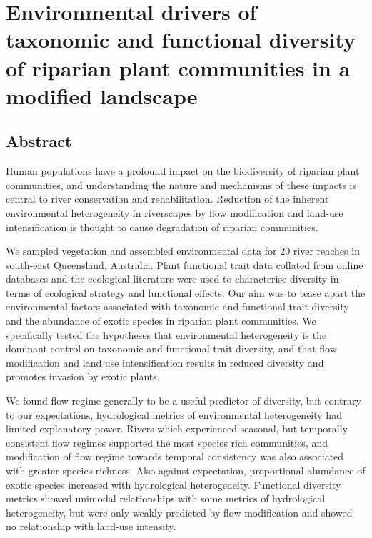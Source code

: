 \documentclass[openright,12pt,a4paper]{memoir}
\begin{document}
\doublespacing

\chapter[Environmental drivers of taxonomic and functional diversity of riparian plant communities in a modified landscape][Diversity in south-east QLD]{Environmental drivers of taxonomic and functional diversity of riparian plant communities in a modified landscape}
\newpage

\section*{Abstract}
Human populations have a profound impact on the biodiversity of riparian plant communities, and understanding the nature and mechanisms of these impacts is central to river conservation and rehabilitation. Reduction of the inherent environmental heterogeneity in riverscapes by flow modification and land-use intensification is thought to cause degradation of riparian communities.

We sampled vegetation and assembled environmental data for 20 river reaches in south-east Queensland, Australia. Plant functional trait data collated from online databases and the ecological literature were used to characterise diversity in terms of ecological strategy and functional effects. Our aim was to tease apart the environmental factors associated with taxonomic and functional trait diversity and the abundance of exotic species in riparian plant communities. We specifically tested the hypotheses that environmental heterogeneity is the dominant control on taxonomic and functional trait diversity, and that flow modification and land use intensification results in reduced diversity and promotes invasion by exotic plants.

We found flow regime generally to be a useful predictor of diversity, but contrary to our expectations, hydrological metrics of environmental heterogeneity had limited explanatory power. Rivers which experienced seasonal, but temporally consistent flow regimes supported the most species rich communities, and modification of flow regime towards temporal consistency was also associated with greater species richness. Also against expectation, proportional abundance of exotic species increased with hydrological heterogeneity. Functional diversity metrics showed unimodal relationships with some metrics of hydrological heterogeneity, but were only weakly predicted by flow modification and showed no relationship with land-use intensity.
\end{document}
